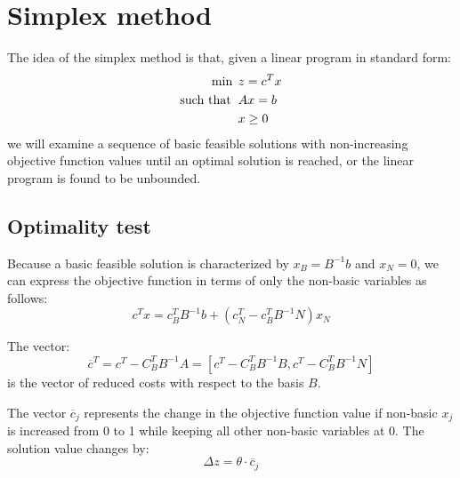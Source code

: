 \section{Simplex method}

The idea of the simplex method is that, given a linear program in standard form: 
\begin{align*}
    \min                      \:&\: z=c^Tx              \\
    \textnormal{such that }     &\: Ax=b                \\
                                &\: x \geq 0
\end{align*}
we will examine a sequence of basic feasible solutions with non-increasing objective function values until an optimal solution is reached, or the  linear program is 
found to be unbounded. 

\subsection{Optimality test}
Because a basic feasible solution is characterized by $x_B=B^{-1}b$ and $x_N=0$, we can express the objective function in terms of only the non-basic variables as follows:
\[c^Tx=c_B^TB^{-1}b+\left(c_N^T-c_B^TB^{-1}N\right)x_N\]
\begin{definition}
    The vector: 
    \[\overline{c}^T=c^T-C_B^TB^{-1}A=\left[c^T-C_B^TB^{-1}B,c^T-C_B^TB^{-1}N\right]\]
    is the vector of reduced costs with respect to the basis $B$. 
\end{definition}
The vector $\overline{c}_j$ represents the change in the objective function value if non-basic $x_j$ is increased from 0 to 1 while keeping all other non-basic variables at 0. 
The solution value changes by:
\[\Delta z=\theta \cdot \overline{c}_j\]

